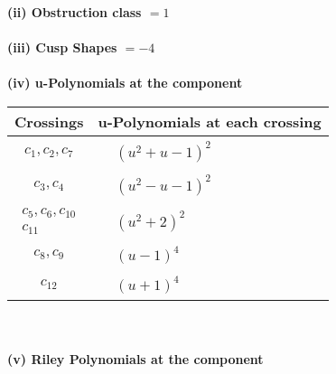 \documentclass[1p]{elsarticle_modified}
\theoremstyle{definition}
\begin{document}
\flushleft \textbf{(ii) Obstruction class $= 1$}\\~\\
\flushleft \textbf{(iii) Cusp Shapes $= -4$}\\~\\
\newpage\renewcommand{\arraystretch}{1}
\flushleft \textbf{(iv) u-Polynomials at the component}\newline \\
\begin{tabular}{m{50pt}|m{274pt}}
Crossings & \hspace{64pt}u-Polynomials at each crossing \\
\hline $$\begin{aligned}c_{1},c_{2},c_{7}\end{aligned}$$&$\begin{aligned}
&(u^2+u-1)^2
\end{aligned}$\\
\hline $$\begin{aligned}c_{3},c_{4}\end{aligned}$$&$\begin{aligned}
&(u^2- u-1)^2
\end{aligned}$\\
\hline $$\begin{aligned}c_{5},c_{6},c_{10}\\c_{11}\end{aligned}$$&$\begin{aligned}
&(u^2+2)^2
\end{aligned}$\\
\hline $$\begin{aligned}c_{8},c_{9}\end{aligned}$$&$\begin{aligned}
&(u-1)^4
\end{aligned}$\\
\hline $$\begin{aligned}c_{12}\end{aligned}$$&$\begin{aligned}
&(u+1)^4
\end{aligned}$\\
\hline
\end{tabular}\\~\\
\newpage\renewcommand{\arraystretch}{1}
\flushleft \textbf{(v) Riley Polynomials at the component}\newline \\
\end{document}
